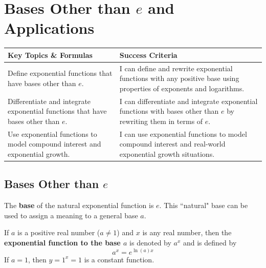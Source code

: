 \documentclass[12pt, letterpaper]{article}
\begin{document}
\section{Bases Other than $e$ and Applications}
\begin{objectives}
    \renewcommand{\arraystretch}{1.5} %
    \begin{tabularx}{\textwidth}{@{} >{\raggedright\arraybackslash}X >{\raggedright\arraybackslash}X @{}}
        
        \textbf{Key Topics \& Formulas} & \textbf{Success Criteria} \\ 
        \midrule[1.5pt] %
        
        Define exponential functions that have bases other than $e$.
        & I can define and rewrite exponential functions with any positive base using properties of exponents and logarithms. \\
        \midrule %
        
        Differentiate and integrate exponential functions that have bases other than $e$.
        & I can differentiate and integrate exponential functions with bases other than $e$ by rewriting them in terms of $e$. \\
        \midrule

        Use exponential functions to model compound interest and exponential growth.
        & I can use exponential functions to model compound interest and real-world exponential growth situations.
    \end{tabularx}
\end{objectives}

\subsection{Bases Other than $e$}

The \textbf{base} of the natural exponential function is $e$. This ``natural" base can be used to assign a meaning to a general base $a$.

\begin{definition}[title=Definition of Exponential Function to Base $a$]
    If $a$ is a positive real number ($a\neq1$) and $x$ is any real number, then the \textbf{exponential function to the base $a$} is denoted by $a^x$ and is defined by 
    $$a^x = e^{\ln(a)x}$$
    If $a=1$, then $y=1^x=1$ is a constant function.
\end{definition}
\end{document}
